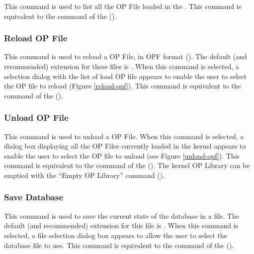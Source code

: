 This command is used to list all the OP File loaded
in the \XPK{}. This command is equivalent to the  command
of the \CPK{} ().

\subsubsection{Reload OP File}


This command is used to reload a OP File, in OPF format (). The default (and recommended) extension for these files is
 . When this command is selected, a selection dialog with the list
of load OP file appears to enable the user to select the OP file to
reload (Figure \ref{reload-opf}). This command is equivalent to the  command of the
\CPK{} ().

\subsubsection{\XOPRS{} Unload OP File}


This command is used to unload a OP File. When this command is selected, a
dialog box displaying all the OP Files currently loaded in the kernel appears
to enable the user to select the OP file to unload (see Figure
\ref{unload-opf}). This command is equivalent to the  command
of the \CPK{} ().  The kernel
OP Library can be emptied with the ``Empty OP Library'' command ().

\subsubsection{Save Database}

This command is used to save the current state of the database in a file. The
default (and recommended) extension for this file is  . When this
command is selected, a file selection dialog box appears to allow the user to
select the database file to use. This command is equivalent to the
 command of the \CPK{} ().

